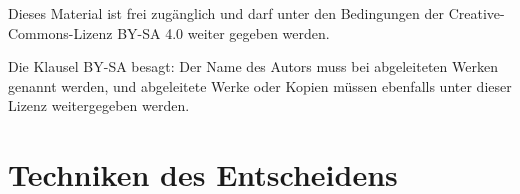 \documentclass[12pt, a4paper, german]{book}
\numberwithin {equation}{section}
\begin{document}
\begin{titlepage}
\begin{center}
\vspace{0.5cm}

\begin{small}

Dieses Material ist frei zugänglich und darf unter den Bedingungen der
Creative-Commons-Lizenz BY-SA 4.0 weiter gegeben werden.

\vspace{0.5cm}

Die Klausel BY-SA besagt: Der Name des Autors muss bei abgeleiteten Werken
genannt werden, und abgeleitete Werke oder Kopien müssen ebenfalls unter
dieser Lizenz weitergegeben werden.

\end{small}

\end{center}

\end{titlepage}

\tableofcontents
\newpage 
 
\setlength{\marginparwidth}{2cm}



\chapter{Techniken des Entscheidens}


\newpage

 
\newpage
 
\newpage


% 
% 

% 
% 



% 
% 

% 
% 



\end{document}
